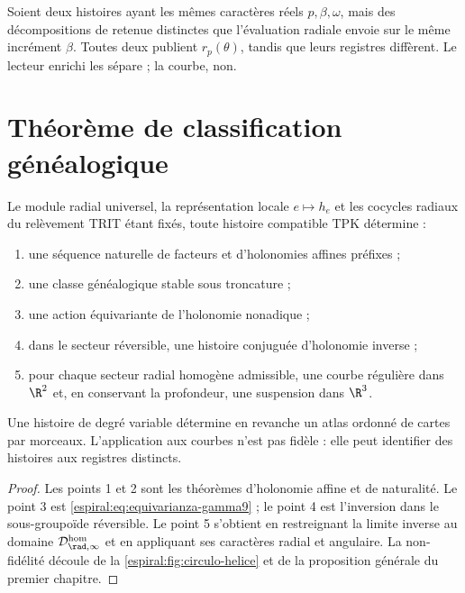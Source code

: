 \begin{example}
Soient deux histoires ayant les mêmes caractères réels \(p,\beta,\omega\), mais des décompositions de retenue distinctes que l'évaluation radiale envoie sur le même incrément \(\beta\). Toutes deux publient \(r_p(\theta)\), tandis que leurs registres diffèrent. Le lecteur enrichi les sépare ; la courbe, non.
\end{example}

\section{Théorème de classification généalogique}

\begin{theorem}
Le module radial universel, la représentation locale \(e\mapsto h_e\) et les cocycles radiaux du relèvement TRIT étant fixés, toute histoire compatible TPK détermine :
\begin{enumerate}
\item une séquence naturelle de facteurs et d'holonomies affines préfixes ;
\item une classe généalogique stable sous troncature ;
\item une action équivariante de l'holonomie nonadique ;
\item dans le secteur réversible, une histoire conjuguée d'holonomie inverse ;
\item pour chaque secteur radial homogène admissible, une courbe régulière dans \(\R^2\) et, en conservant la profondeur, une suspension dans \(\R^3\).
\end{enumerate}
Une histoire de degré variable détermine en revanche un atlas ordonné de cartes par morceaux. L'application aux courbes n'est pas fidèle : elle peut identifier des histoires aux registres distincts.
\end{theorem}
\begin{proof}
Les points 1 et 2 sont les théorèmes d'holonomie affine et de naturalité. Le point 3 est \cref{espiral:eq:equivarianza-gamma9} ; le point 4 est l'inversion dans le sous-groupoïde réversible. Le point 5 s'obtient en restreignant la limite inverse au domaine \(\mathcal D_{\rad,\infty}^{\mathrm{hom}}\) et en appliquant ses caractères radial et angulaire. La non-fidélité découle de la \cref{espiral:fig:circulo-helice} et de la proposition générale du premier chapitre.
\end{proof}

